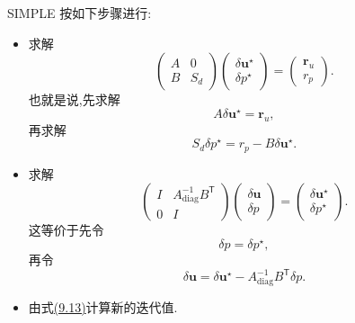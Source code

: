 \begin{example}
SIMPLE 按如下步骤进行:
\begin{itemize}
  \item 求解
  \[
  \begin{pmatrix}A&0\\B&S_d\end{pmatrix}
  \begin{pmatrix}\delta\bm u^{\star}\\\delta p^{\star}\end{pmatrix}
  =\begin{pmatrix}\bm r_u\\r_p\end{pmatrix}.
  \]
  也就是说,先求解
  \begin{equation}\label{eq:chapter9-simple-velocity}
   A\delta\bm u^{\star}=\bm r_u,
  \end{equation}
  再求解
  \begin{equation}\label{eq:chapter9-simple-pressure}
   S_d\delta p^{\star}=r_p-B\delta\bm u^{\star}.
  \end{equation}
  \item 求解
  \[
  \begin{pmatrix}I&A_{\mathrm{diag}}^{-1}B^{\mathsf T}\\0&I\end{pmatrix}
  \begin{pmatrix}\delta\bm u\\\delta p\end{pmatrix}
  =\begin{pmatrix}\delta\bm u^{\star}\\\delta p^{\star}\end{pmatrix}.
  \]
  这等价于先令
  \begin{equation}\label{eq:chapter9-simple-pressure-update}
   \delta p=\delta p^{\star},
  \end{equation}
  再令
  \[
   \delta\bm u=\delta\bm u^{\star}-A_{\mathrm{diag}}^{-1}B^{\mathsf T}\delta p.
  \]
  \item 由式\hyperref[eq:chapter9-simple-update]{(9.13)}计算新的迭代值.
\end{itemize}


\end{example}
